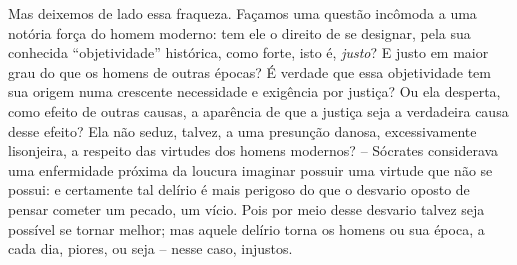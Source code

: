 Mas deixemos de lado essa fraqueza. Façamos uma questão incômoda a uma
notória força do homem moderno: tem ele o direito de se designar, pela
sua conhecida ``objetividade'' histórica, como forte, isto é,
\emph{justo}? E justo em maior grau do que os homens de outras épocas? É
verdade que essa objetividade tem sua origem numa crescente necessidade
e exigência por justiça? Ou ela desperta, como efeito de outras causas,
a aparência de que a justiça seja a verdadeira causa desse efeito? Ela
não seduz, talvez, a uma presunção danosa, excessivamente lisonjeira, a
respeito das virtudes dos homens modernos? -- Sócrates considerava uma
enfermidade próxima da loucura imaginar possuir uma virtude que não se
possui: e certamente tal delírio é mais perigoso do que o desvario
oposto de pensar cometer um pecado, um vício. Pois por meio desse
desvario talvez seja possível se tornar melhor; mas aquele delírio torna
os homens ou sua época, a cada dia, piores, ou seja -- nesse caso, injustos.

